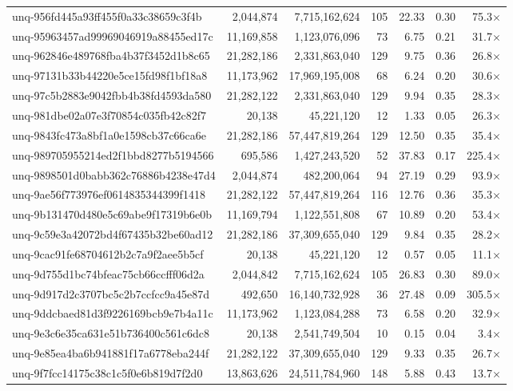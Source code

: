 \begin{table}[h!]
\begin{tabular}{lrrrrrr}
unq-956fd445a93ff455f0a33c38659c3f4b & 2,044,874 & 7,715,162,624 & 105 & 22.33 & 0.30 & 75.3$\times$ \\
unq-95963457ad99969046919a88455ed17c & 11,169,858 & 1,123,076,096 & 73 & 6.75 & 0.21 & 31.7$\times$ \\
unq-962846e489768fba4b37f3452d1b8c65 & 21,282,186 & 2,331,863,040 & 129 & 9.75 & 0.36 & 26.8$\times$ \\
unq-97131b33b44220e5ce15fd98f1bf18a8 & 11,173,962 & 17,969,195,008 & 68 & 6.24 & 0.20 & 30.6$\times$ \\
unq-97c5b2883e9042fbb4b38fd4593da580 & 21,282,122 & 2,331,863,040 & 129 & 9.94 & 0.35 & 28.3$\times$ \\
unq-981dbe02a07e3f70854c035fb42c82f7 & 20,138 & 45,221,120 & 12 & 1.33 & 0.05 & 26.3$\times$ \\
unq-9843fc473a8bf1a0e1598cb37c66ca6e & 21,282,186 & 57,447,819,264 & 129 & 12.50 & 0.35 & 35.4$\times$ \\
unq-989705955214ed2f1bbd8277b5194566 & 695,586 & 1,427,243,520 & 52 & 37.83 & 0.17 & 225.4$\times$ \\
unq-9898501d0babb362c76886b4238e47d4 & 2,044,874 & 482,200,064 & 94 & 27.19 & 0.29 & 93.9$\times$ \\
unq-9ae56f773976ef0614835344399f1418 & 21,282,122 & 57,447,819,264 & 116 & 12.76 & 0.36 & 35.3$\times$ \\
unq-9b131470d480e5c69abe9f17319b6e0b & 11,169,794 & 1,122,551,808 & 67 & 10.89 & 0.20 & 53.4$\times$ \\
unq-9c59e3a42072bd4f67435b32be60ad12 & 21,282,186 & 37,309,655,040 & 129 & 9.84 & 0.35 & 28.2$\times$ \\
unq-9cac91fe68704612b2c7a9f2aee5b5cf & 20,138 & 45,221,120 & 12 & 0.57 & 0.05 & 11.1$\times$ \\
unq-9d755d1bc74bfeac75cb66ccfff06d2a & 2,044,842 & 7,715,162,624 & 105 & 26.83 & 0.30 & 89.0$\times$ \\
unq-9d917d2c3707bc5c2b7ccfcc9a45e87d & 492,650 & 16,140,732,928 & 36 & 27.48 & 0.09 & 305.5$\times$ \\
unq-9ddcbaed81d3f9226169bcb9e7b4a11c & 11,173,962 & 1,123,084,288 & 73 & 6.58 & 0.20 & 32.9$\times$ \\
unq-9e3c6e35ca631e51b736400c561c6dc8 & 20,138 & 2,541,749,504 & 10 & 0.15 & 0.04 & 3.4$\times$ \\
unq-9e85ea4ba6b941881f17a6778eba244f & 21,282,122 & 37,309,655,040 & 129 & 9.33 & 0.35 & 26.7$\times$ \\
unq-9f7fcc14175c38c1c5f0e6b819d7f2d0 & 13,863,626 & 24,511,784,960 & 148 & 5.88 & 0.43 & 13.7$\times$ \\

\end{tabular}
\end{table}
